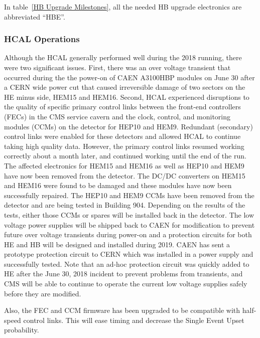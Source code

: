\documentclass[12pt]{article}
\begin{document}
In table~\ref{HB Upgrade Milestones}, all the needed HB upgrade electronics are abbreviated ``HBE''.



\subsubsection{HCAL Operations }
Although the HCAL generally performed well during the 2018 running, there were two significant issues.
First, there was an over voltage transient that occurred during the the power-on of CAEN A3100HBP modules 
on June 30 after a CERN wide power cut that caused
irreversible damage of two sectors on the HE minus side, HEM15 and HEM16. 
Second,
HCAL experienced disruptions 
to the quality of specific primary control links between the front-end controllers (FECs) in the CMS service cavern 
and the clock, control, and monitoring modules (CCMs) on the detector for HEP10 and HEM9.
Redundant (secondary) control links were enabled for these detectors and allowed 
HCAL to continue taking high quality data. However, the primary control links resumed
working correctly about a month later, and continued working until the end of the run.
The affected electronics for HEM15 and HEM16 as well as HEP10 and HEM9 have now
been removed from the detector. 
The DC/DC converters on HEM15 and HEM16 were found to be damaged and these
modules have now been successfully repaired. The  HEP10 and HEM9 CCMs
have been removed from the detector and are being tested in Building 904. Depending on the
results of the tests, either those CCMs or spares will be installed back in the detector.
The low voltage power supplies will be shipped back to CAEN for modification
to prevent future over voltage transients during power-on and a protection circuits
for both HE and HB will be designed and installed during 2019.
CAEN has sent a prototype protection circuit to CERN which was installed in a
power supply and  successfully tested. Note that  an ad-hoc protection circuit
was quickly added to HE after the June 30, 2018 incident to prevent problems from transients, and
CMS will be able to continue to operate the current low voltage supplies safely before they are
modified.


Also, the FEC and CCM firmware has been upgraded to be compatible with
half-speed control links. This will ease timing and decrease the Single Event Upset probability.
\end{document}
